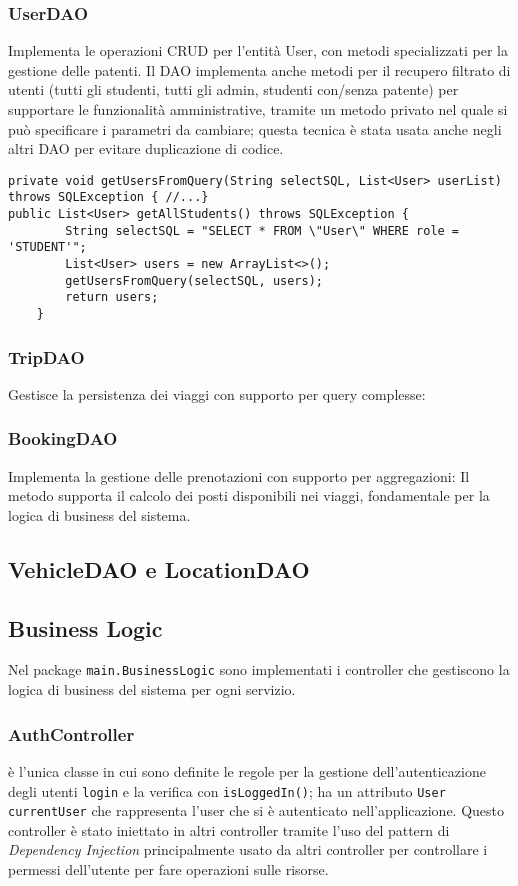 \subsubsection{UserDAO}
Implementa le operazioni CRUD per l'entità User, con metodi specializzati per la gestione delle patenti. Il DAO implementa anche metodi per il recupero filtrato di utenti (tutti gli studenti, tutti gli admin, studenti con/senza patente) per supportare le funzionalità amministrative, tramite un metodo privato nel quale si può specificare i parametri da cambiare; questa tecnica è stata usata anche negli altri DAO per evitare duplicazione di codice.
\begin{lstlisting}[style=java, caption={Metodo per ottenere tutti gli User che soddisfano alcuni criteri}]
private void getUsersFromQuery(String selectSQL, List<User> userList) throws SQLException { //...}
public List<User> getAllStudents() throws SQLException {
        String selectSQL = "SELECT * FROM \"User\" WHERE role = 'STUDENT'";
        List<User> users = new ArrayList<>();
        getUsersFromQuery(selectSQL, users);
        return users;
    }
\end{lstlisting}
\subsubsection{TripDAO}
Gestisce la persistenza dei viaggi con supporto per query complesse:
\subsubsection{BookingDAO}
Implementa la gestione delle prenotazioni con supporto per aggregazioni:
Il metodo supporta il calcolo dei posti disponibili nei viaggi, fondamentale per la logica di business del sistema.
\subsection{VehicleDAO e LocationDAO}
\subsection{Business Logic}
Nel package \texttt{main.BusinessLogic} sono implementati i controller che gestiscono la logica di business del sistema per ogni servizio.
\subsubsection{AuthController}
è l'unica classe in cui sono definite le regole per la gestione dell'autenticazione degli utenti \texttt{login} e la verifica con \texttt{isLoggedIn()}; ha un attributo \texttt{User currentUser} che rappresenta l'user che si è autenticato nell'applicazione. 
Questo controller è stato iniettato in altri controller tramite l'uso del pattern di \textit{Dependency Injection} principalmente usato da altri controller per controllare i permessi dell'utente per fare operazioni sulle risorse.
